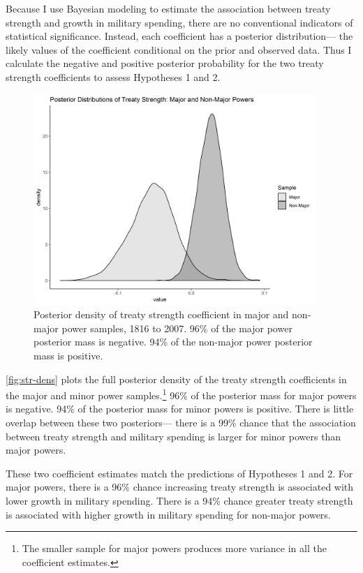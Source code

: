 \documentclass[12pt]{article}
\begin{document}
Because I use Bayesian modeling to estimate the association between treaty strength and growth in military spending, there are no conventional indicators of statistical significance. 
Instead, each coefficient has a posterior distribution--- the likely values of the coefficient conditional on the prior and observed data. 
Thus I calculate the negative and positive posterior probability for the two treaty strength coefficients to assess Hypotheses 1 and 2.


\begin{figure}[htbp]
	\centering
		\includegraphics[width=0.95\textwidth]{../figures/str-dens.png}
	\caption{Posterior density of treaty strength coefficient in major and non-major power samples, 1816 to 2007. 96\% of the major power posterior mass is negative. 94\% of the non-major power posterior mass is positive.}
	\label{fig:str-dens}
\end{figure}


\autoref{fig:str-dens} plots the full posterior density of the treaty strength coefficients in the major and minor power samples.\footnote{The smaller sample for major powers produces more variance in all the coefficient estimates.} 
96\% of the posterior mass for major powers is negative. 
94\% of the posterior mass for minor powers is positive. 
There is little overlap between these two posteriors--- there is a 99\% chance that the association between treaty strength and military spending is larger for minor powers than major powers. 


These two coefficient estimates match the predictions of Hypotheses 1 and 2. 
For major powers, there is a 96\% chance increasing treaty strength is associated with lower growth in military spending. 
There is a 94\% chance greater treaty strength is associated with higher growth in military spending for non-major powers.
\end{document}

